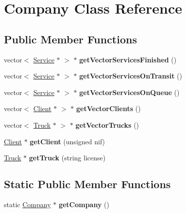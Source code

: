 \hypertarget{class_company}{}\section{Company Class Reference}
\label{class_company}
\subsection*{Public Member Functions}
\begin{DoxyCompactItemize}
\item 
\mbox{\label{class_company_ae818941883e08e25e93373f29922f9b3}} 
vector$<$ \hyperlink{class_service}{Service} $\ast$ $>$ $\ast$ {\bfseries get\+Vector\+Services\+Finished} ()
\item 
\mbox{\label{class_company_ab83ddbd16558f0e99efa7c56878e0ec8}} 
vector$<$ \hyperlink{class_service}{Service} $\ast$ $>$ $\ast$ {\bfseries get\+Vector\+Services\+On\+Transit} ()
\item 
\mbox{\label{class_company_adffe3680413d999c922858c88fbd18a6}} 
vector$<$ \hyperlink{class_service}{Service} $\ast$ $>$ $\ast$ {\bfseries get\+Vector\+Services\+On\+Queue} ()
\item 
\mbox{\label{class_company_a16693c2e4bf9a932e15926c37c21485f}} 
vector$<$ \hyperlink{class_client}{Client} $\ast$ $>$ $\ast$ {\bfseries get\+Vector\+Clients} ()
\item 
\mbox{\label{class_company_a78feb735977ce59f253a30082dbf24b6}} 
vector$<$ \hyperlink{class_truck}{Truck} $\ast$ $>$ $\ast$ {\bfseries get\+Vector\+Trucks} ()
\item 
\mbox{\label{class_company_ae8efdaf521467fd204c8d272f4469679}} 
\hyperlink{class_client}{Client} $\ast$ {\bfseries get\+Client} (unsigned nif)
\item 
\mbox{\label{class_company_acb9c7285e4ca619899017bd1221a1d27}} 
\hyperlink{class_truck}{Truck} $\ast$ {\bfseries get\+Truck} (string license)
\end{DoxyCompactItemize}
\subsection*{Static Public Member Functions}
\begin{DoxyCompactItemize}
\item 
\mbox{\label{class_company_a453411f6ef4bab2e878867302fdcf484}} 
static \hyperlink{class_company}{Company} $\ast$ {\bfseries get\+Company} ()
\end{DoxyCompactItemize}

